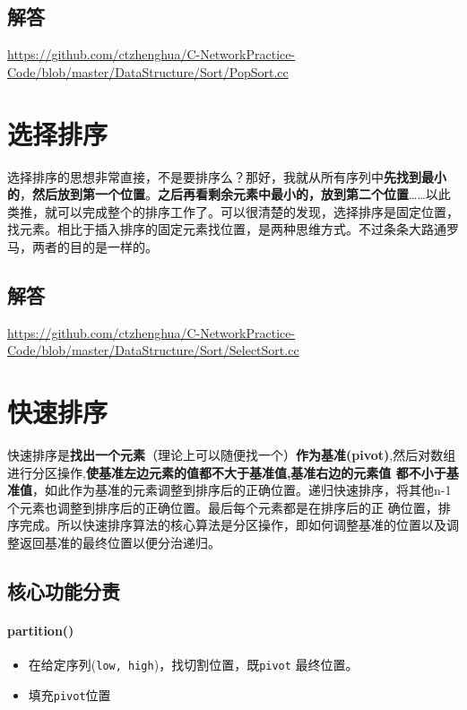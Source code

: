 \documentclass[UTF8,a4paper,12pt]{ctexbook}
\begin{document}
	\subsection{解答}
	\url{https://github.com/ctzhenghua/C-NetworkPractice-Code/blob/master/DataStructure/Sort/PopSort.cc}
		
\section{选择排序}
	
	选择排序的思想非常直接，不是要排序么？那好，我就从所有序列中\textbf{先找到最小的}，\textbf{然后放到第一个位置}。\textbf{之后再看剩余元素中最小的，放到第二个位置}……以此类推，就可以完成整个的排序工作了。可以很清楚的发现，选择排序是固定位置，找元素。相比于插入排序的固定元素找位置，是两种思维方式。不过条条大路通罗马，两者的目的是一样的。
	
	\subsection{解答}
	\url{https://github.com/ctzhenghua/C-NetworkPractice-Code/blob/master/DataStructure/Sort/SelectSort.cc}

\newpage		
\section{快速排序}

	快速排序是\textbf{找出一个元素}（理论上可以随便找一个）\textbf{作为基准(pivot)},然后对数组进行分区操作,\textbf{使基准左边元素的值都不大于基准值,基准右边的元素值 都不小于基准值}，如此作为基准的元素调整到排序后的正确位置。递归快速排序，将其他n-1个元素也调整到排序后的正确位置。最后每个元素都是在排序后的正 确位置，排序完成。所以快速排序算法的核心算法是分区操作，即如何调整基准的位置以及调整返回基准的最终位置以便分治递归。
	
	\subsection{核心功能分责}
		\paragraph{partition()}
			\begin{itemize}
				\item 在给定序列(\verb|low, high|)，找切割位置，既\verb|pivot| 最终位置。
				\item 填充\verb|pivot|位置
			\end{itemize}
		
\end{document}
